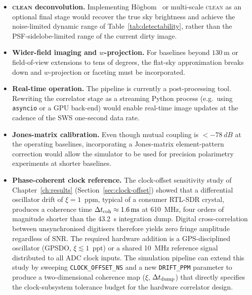 \begin{itemize}[leftmargin=1.5em]
        Extending the pipeline to a multi-channel mode would enable spectro-spatial
        imaging, tracing a burst's frequency drift (and hence electron beam velocity)
        across the corona.
  \item \textbf{\textsc{clean} deconvolution.} Implementing H\"ogbom~\citep{hogbom1974} or
        multi-scale \textsc{clean} as an optional final stage would recover the true
        sky brightness and achieve the noise-limited dynamic range of
        Table~\ref{tab:detectability}, rather than the PSF-sidelobe-limited range of
        the current dirty image.
  \item \textbf{Wider-field imaging and $w$-projection.} For baselines beyond
        $\SI{130}{\metre}$ or field-of-view extensions to tens of degrees, the flat-sky
        approximation breaks down and $w$-projection or faceting must be incorporated.
  \item \textbf{Real-time operation.} The pipeline is currently a post-processing tool.
        Rewriting the correlator stage as a streaming Python process (e.g.\ using
        \texttt{asyncio} or a GPU back-end) would enable real-time image updates
        at the cadence of the SWS one-second data rate.
  \item \textbf{Jones-matrix calibration.} Even though mutual coupling is $<-78~\si{dB}$
        at the operating baselines, incorporating a Jones-matrix element-pattern correction
        would allow the simulator to be used for precision polarimetry experiments at
        shorter baselines.
  \item \textbf{Phase-coherent clock reference.}
        The clock-offset sensitivity study of Chapter~\ref{ch:results}
        (Section~\ref{sec:clock-offset}) showed that a differential oscillator drift of
        $\xi=1$~ppm, typical of a consumer RTL-SDR crystal, produces a coherence
        time $\Delta t_{\rm coh}\approx\SI{1.6}{\milli\second}$ at \SI{610}{\mega\hertz},
        four orders of magnitude shorter than the \SI{43.2}{\second} integration dump.
        Digital cross-correlation between unsynchronised digitisers therefore yields zero
        fringe amplitude regardless of SNR.  The required hardware addition is a
        GPS-disciplined oscillator (GPSDO, $\xi\lesssim1$~ppt) or a shared
        \SI{10}{\mega\hertz} reference signal distributed to all ADC clock inputs.
        The simulation pipeline can extend this study by sweeping
        \texttt{CLOCK\_OFFSET\_NS} and a new \texttt{DRIFT\_PPM} parameter to produce
        a two-dimensional coherence map ($\xi$, $\Delta t_{\rm dump}$) that
        directly specifies the clock-subsystem tolerance budget for the hardware
        correlator design.
\end{itemize}

